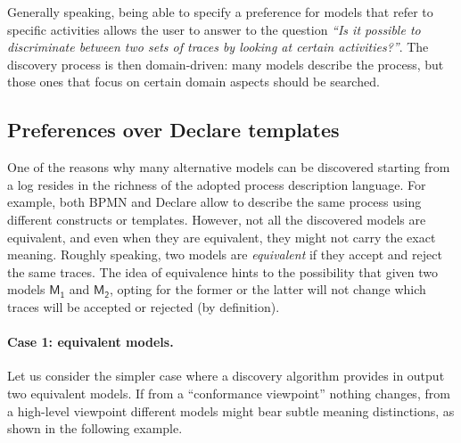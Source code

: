 Generally speaking, being able to specify a preference for models that refer to specific activities allows the user to answer to the question \emph{``Is it possible to discriminate between two sets of traces by looking at certain activities?''}. The discovery process is then domain-driven: many models describe the process, but those ones that focus on certain domain aspects should be searched.




\subsection{Preferences over Declare templates}
\label{subsec:prefOverTemplates}

One of the reasons why many alternative models can be discovered starting from a log resides in the richness of the adopted process description language. For example, both BPMN and Declare allow to describe the same process using different constructs or templates. 
However, not all the discovered models are equivalent, and even when they are equivalent, they might not carry the exact meaning. Roughly speaking, two models are \emph{equivalent} if they accept and reject the same traces. The idea of equivalence hints to the possibility that given two models $\mathsf{M_1}$ and $\mathsf{M_2}$, opting for the former or the latter will not change which traces will be accepted or rejected (by definition).

\paragraph{Case 1: equivalent models.} Let us consider the simpler case where a discovery algorithm provides in output two equivalent models. If from a ``conformance viewpoint'' nothing changes, from a high-level viewpoint different models might bear subtle meaning distinctions, as shown in the following example.

